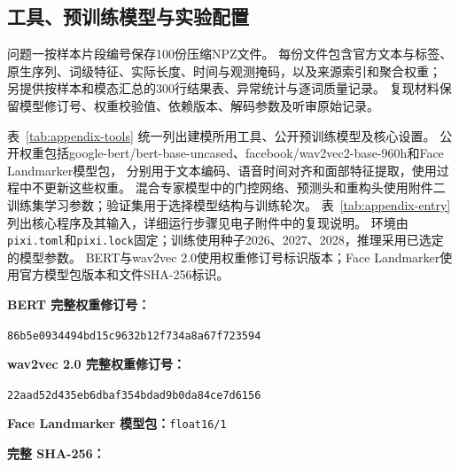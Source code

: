\subsection{工具、预训练模型与实验配置}
\label{sec:appendix-runtime}
问题一按样本片段编号保存100份压缩NPZ文件。
每份文件包含官方文本与标签、原生序列、词级特征、实际长度、时间与观测掩码，以及来源索引和聚合权重；
另提供按样本和模态汇总的300行结果表、异常统计与逐词质量记录。
复现材料保留模型修订号、权重校验值、依赖版本、解码参数及听审原始记录。

表~\ref{tab:appendix-tools} 统一列出建模所用工具、公开预训练模型及核心设置。
公开权重包括google-bert/bert-base-uncased、facebook/wav2vec2-base-960h和Face Landmarker模型包，
分别用于文本编码、语音时间对齐和面部特征提取，使用过程中不更新这些权重。
混合专家模型中的门控网络、预测头和重构头使用附件二训练集学习参数；验证集用于选择模型结构与训练轮次。
表~\ref{tab:appendix-entry}列出核心程序及其输入，详细运行步骤见电子附件中的复现说明。
环境由\texttt{pixi.toml}和\texttt{pixi.lock}固定；训练使用种子2026、2027、2028，推理采用已选定的模型参数。
BERT与wav2vec 2.0使用权重修订号标识版本；Face Landmarker使用官方模型包版本和文件SHA-256标识。

\noindent\textbf{BERT 完整权重修订号：}\par\nopagebreak
\noindent\texttt{86b5e0934494bd15c9632b12f734a8a67f723594}\par\smallskip
\noindent\textbf{wav2vec 2.0 完整权重修订号：}\par\nopagebreak
\noindent\texttt{22aad52d435eb6dbaf354bdad9b0da84ce7d6156}\par\smallskip
\noindent\textbf{Face Landmarker 模型包：}\texttt{float16/1}\par\nopagebreak
\noindent\textbf{完整 SHA-256：}\par\nopagebreak
{}\par

